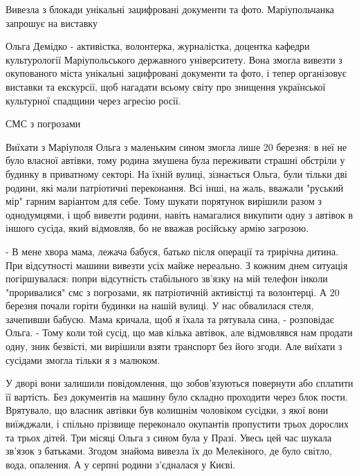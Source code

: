  
 
 
 
 

Вивезла з блокади унікальні зацифровані документи та фото. Маріупольчанка запрошує на виставку

Ольга Демідко - активістка, волонтерка, журналістка, доцентка кафедри
культурології Маріупольського державного університету. Вона змогла вивезти з
окупованого міста унікальні зацифровані документи та фото, і тепер організовує
виставки та екскурсії, щоб нагадати всьому світу про знищення української
культурної спадщини через агресію росії. 

СМС з погрозами 

Виїхати з Маріуполя Ольга з маленьким сином змогла лише 20 березня: в неї не
було власної автівки, тому родина змушена була переживати страшні обстріли у
будинку в приватному секторі. На їхній вулиці, зізнається Ольга, були тільки
дві родини, які мали патріотичні переконання. Всі інші, на жаль, вважали
"руський мір" гарним варіантом для себе. Тому шукати порятунок вирішили разом з
однодумцями, і щоб вивезти родини, навіть намагалися викупити одну з автівок в
іншого сусіда, який відмовляв, бо не вважав російську армію загрозою. 

- В мене хвора мама, лежача бабуся, батько після операції та трирічна дитина.
При відсутності машини вивезти усіх майже нереально. З кожним днем ситуація
погіршувалася: попри відсутність стабільного зв'язку на мій телефон інколи
"проривалися" смс з погрозами, як патріотичній активістці та волонтерці. А 20
березня почали горіти будинки на нашій вулиці. У нас обвалилася стеля,
зачепивши бабусю. Мама кричала, щоб я їхала та рятувала сина, - розповідає
Ольга. -  Тому коли той сусід, що мав кілька автівок, але відмовлявся нам
продати одну, зник безвісті, ми вирішили взяти транспорт без його згоди. Але
виїхати з сусідами змогла тільки я з малюком.

У дворі вони залишили повідомлення, що зобов'язуються повернути або сплатити її
вартість. Без документів на машину було складно проходити через блок пости.
Врятувало, що власник автівки був колишнім чоловіком сусідки, з якої вони
виїжджали, і спільно прізвище переконало окупантів пропустити трьох дорослих та
трьох дітей. Три місяці Ольга з сином була у Празі. Увесь цей час шукала
зв'язок з батьками. Згодом знайома вивезла їх до Мелекіного, де було світло,
вода, опалення. А у серпні родини з'єдналася у Києві.

